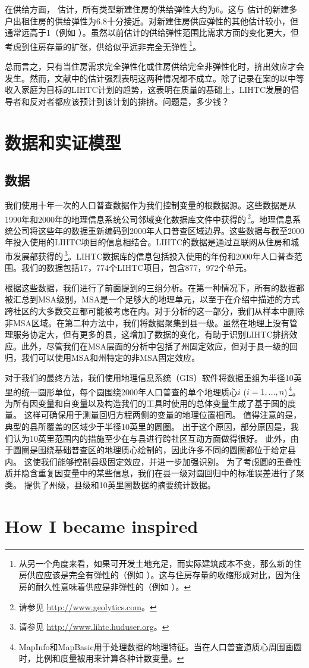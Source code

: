 \documentclass[lang=cn,11pt,a4paper]{paper}
\begin{document}
在供给方面，\cite{Mayer200085} 估计，所有类型新建住房的供给弹性大约为6。这与 \cite{DiPasquale1992337} 估计的新建多户出租住房的供给弹性为6.8十分接近。对新建住房供应弹性的其他估计较小，但通常远高于1（例如 \citep{DiPasquale1992337,Rosen19791}）。虽然以前估计的供给弹性范围比需求方面的变化更大，但考虑到住房存量的扩张，供给似乎远非完全无弹性\,\footnote{从另一个角度来看，如果可开发土地充足，而实际建筑成本不变，那么新的住房供应应该是完全有弹性的（例如 \citep{Rosenthal1994182}）。这与住房存量的收缩形成对比，因为住房的耐久性意味着供应是非弹性的（例如 \citep{Glaeser2005345}）。}。

总而言之，只有当住房需求完全弹性化或住房供给完全非弹性化时，挤出效应才会发生。然而，文献中的估计强烈表明这两种情况都不成立。除了记录在案的以中等收入家庭为目标的LIHTC计划的趋势，这表明在质量的基础上，LIHTC发展的倡导者和反对者都应该预计到该计划的排挤。问题是，多少钱？

\section{数据和实证模型}

\subsection{数据}

我们使用十年一次的人口普查数据作为我们控制变量的根数据源。这些数据是从1990年和2000年的地理信息系统公司邻域变化数据库文件中获得的\,\footnote{请参见 \url{http://www.geolytics.com}。}。地理信息系统公司将这些年的数据重新编码到2000年人口普查区域边界。这些数据与截至2000年投入使用的LIHTC项目的信息相结合。LIHTC的数据是通过互联网从住房和城市发展部获得的\,\footnote{请参见 \url{http://www.lihtc.huduser.org}。}。LIHTC数据库的信息包括投入使用的年份和2000年人口普查范围。我们的数据包括17，774个LIHTC项目，包含877，972个单元。

根据这些数据，我们进行了前面提到的三组分析。在第一种情况下，所有的数据都被汇总到MSA级别，MSA是一个足够大的地理单元，以至于在介绍中描述的方式跨社区的大多数交互都可能被考虑在内。对于分析的这一部分，我们从样本中删除非MSA区域。在第二种方法中，我们将数据聚集到县一级。虽然在地理上没有管理服务协定大，但有更多的县，这增加了数据的变化，有助于识别LIHTC排挤效应。此外，尽管我们在MSA层面的分析中包括了州固定效应，但对于县一级的回归，我们可以使用MSA和州特定的非MSA固定效应。

对于我们的最终方法，我们使用地理信息系统（GIS）软件将数据重组为半径10英里的统一圆形单位，每个圆围绕2000年人口普查的单个地理质心$i$ ($i = 1, \dots,n$)\,\footnote{MapInfo和MapBasic用于处理数据的地理特征。当在人口普查道质心周围画圆时，比例和度量被用来计算各种计数变量。}。为所有因变量和自变量以及构造我们的工具时使用的总体变量生成了基于圆的度量。 这样可确保用于测量回归方程两侧的变量的地理位置相同。 值得注意的是，典型的县所覆盖的区域少于半径10英里的圆圈。 出于这个原因，部分原因是，我们认为10英里范围内的措施至少在与县进行跨社区互动方面做得很好。 此外，由于圆圈是围绕基础普查区的地理质心绘制的，因此许多不同的圆圈都位于给定县内。 这使我们能够控制县级固定效应，并进一步加强识别。 为了考虑圆的重叠性质并隐含重复因变量中的某些信息，我们在县一级对圆回归中的标准误差进行了聚类。 提供了州级，县级和10英里圈数据的摘要统计数据。




\appendix
\appendixpage
\addappheadtotoc
\section{How I became inspired}
\end{document}
